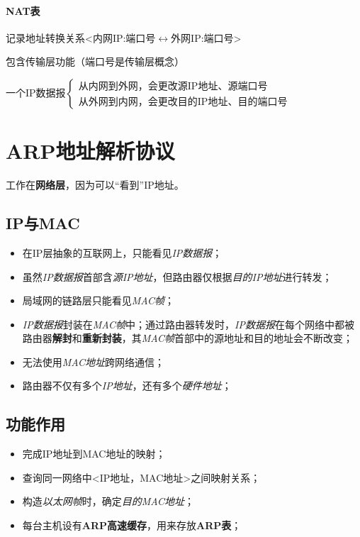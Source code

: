 \paragraph{NAT表}
记录地址转换关系<内网IP:端口号\(\leftrightarrow\)外网IP:端口号>

包含传输层功能（端口号是传输层概念）

一个IP数据报\(\begin{cases}
    \text{从内网到外网，会更改源IP地址、源端口号} \\ 
    \text{从外网到内网，会更改目的IP地址、目的端口号}
\end{cases}\)


\section{ARP地址解析协议}
工作在\textbf{网络层}，因为可以“看到”IP地址。

\subsection{IP与MAC}
\begin{itemize}
    \item 在IP层抽象的互联网上，只能看见\textit{IP数据报}；
    \item 虽然\textit{IP数据报}首部含\textit{源IP地址}，但路由器仅根据\textit{目的IP地址}进行转发；
    \item 局域网的链路层只能看见\textit{MAC帧}；
    \item \textit{IP数据报}封装在\textit{MAC帧}中；通过路由器转发时，\textit{IP数据报}在每个网络中都被路由器\textbf{解封}和\textbf{重新封装}，其\textit{MAC帧}首部中的源地址和目的地址会不断改变；
    \item 无法使用\textit{MAC地址}跨网络通信；
    \item 路由器不仅有多个\textit{IP地址}，还有多个\textit{硬件地址}；
\end{itemize}


\subsection{功能作用}
\begin{itemize}
    \item 完成IP地址到MAC地址的映射；
    \item 查询同一网络中<IP地址，MAC地址>之间映射关系；
    \item 构造\textit{以太网帧}时，确定\textit{目的MAC地址}；
    \item 每台主机设有\textbf{ARP高速缓存}，用来存放\textbf{ARP表}；
\end{itemize}


